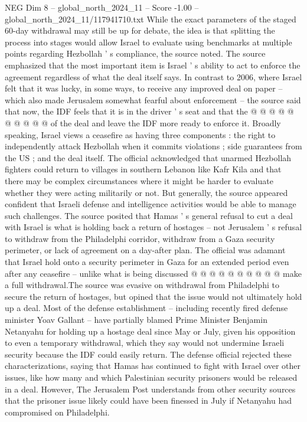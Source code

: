 \begin{textsample}{NEG Dim 8 – global\_north\_2024\_11 – Score -1.00 – global\_north\_2024\_11/117941710.txt}
While the exact parameters of the staged 60-day withdrawal may still be up for debate, the idea is that splitting the process into stages would allow Israel to evaluate using benchmarks at multiple points regarding Hezbollah ' s compliance, the source noted.
The source emphasized that the most important item is Israel ' s ability to act to enforce the agreement regardless of what the deal itself says.
In contrast to 2006, where Israel felt that it was lucky, in some ways, to receive any improved deal on paper -- which also made Jerusalem somewhat fearful about enforcement -- the source said that now, the IDF feels that it is in the driver ' s seat and that the @ @ @ @ @ @ @ @ @ @ of the deal and leave the IDF more ready to enforce it.
Broadly speaking, Israel views a ceasefire as having three components : the right to independently attack Hezbollah when it commits violations ; side guarantees from the US ; and the deal itself.
The official acknowledged that unarmed Hezbollah fighters could return to villages in southern Lebanon like Kafr Kila and that there may be complex circumstances where it might be harder to evaluate whether they were acting militarily or not.
But generally, the source appeared confident that Israeli defense and intelligence activities would be able to manage such challenges.
The source posited that Hamas ' s general refusal to cut a deal with Israel is what is holding back a return of hostages -- not Jerusalem ' s refusal to withdraw from the Philadelphi corridor, withdraw from a Gaza security perimeter, or lack of agreement on a day-after plan.
The official was adamant that Israel hold onto a security perimeter in Gaza for an extended period even after any ceasefire -- unlike what is being discussed @ @ @ @ @ @ @ @ @ @ make a full withdrawal.The source was evasive on withdrawal from Philadelphi to secure the return of hostages, but opined that the issue would not ultimately hold up a deal.
Most of the defense establishment -- including recently fired defense minister Yoav Gallant -- have partially blamed Prime Minister Benjamin Netanyahu for holding up a hostage deal since May or July, given his opposition to even a temporary withdrawal, which they say would not undermine Israeli security because the IDF could easily return.
The defense official rejected these characterizations, saying that Hamas has continued to fight with Israel over other issues, like how many and which Palestinian security prisoners would be released in a deal.
However, The Jerusalem Post understands from other security sources that the prisoner issue likely could have been finessed in July if Netanyahu had compromised on Philadelphi.

\end{textsample}
